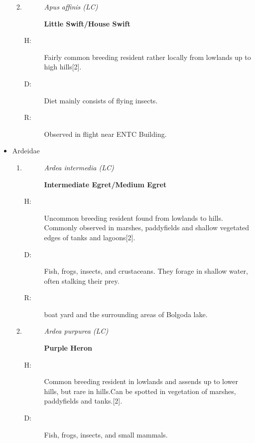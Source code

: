 \begin{itemize}
\begin{enumerate}
\begin{description}
\end{description}%
\item%
\begin{description}%
\item[]%
\textit{ Apus affinis (LC)}%
\item[]%
\textbf{Little Swift/House Swift}%
\end{description}%
\begin{description}%
\item[H: ]%
Fairly common breeding resident rather locally from lowlands up to high hills{[}2{]}.%
\item[D: ]%
Diet mainly consists of flying insects.%
\item[R: ]%
Observed in flight near ENTC Building.%
\end{description}%
\end{enumerate}%
\item%
Ardeidae%
\begin{enumerate}%
\item%
\begin{description}%
\item[]%
\textit{Ardea intermedia (LC)}%
\item[]%
\textbf{Intermediate Egret/Medium Egret}%
\end{description}%
\begin{description}%
\item[H: ]%
Uncommon breeding resident found from lowlands to hills. Commonly observed in marshes, paddyfields and shallow vegetated edges of tanks and lagoons{[}2{]}.%
\item[D: ]%
Fish, frogs, insects, and crustaceans. They forage in shallow water, often stalking their prey.%
\item[R: ]%
boat yard and the surrounding areas of Bolgoda lake.%
\end{description}%
\item%
\begin{description}%
\item[]%
\textit{Ardea purpurea (LC)}%
\item[]%
\textbf{Purple Heron}%
\end{description}%
\begin{description}%
\item[H: ]%
Common breeding resident in lowlands and assends up to lower hills, but rare in hills.Can be spotted in vegetation of marshes, paddyfields and tanks.{[}2{]}.%
\item[D: ]%
Fish, frogs, insects, and small mammals.%

\end{description}
\end{enumerate}
\end{itemize}
